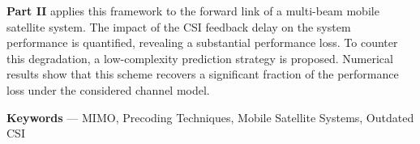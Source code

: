 \textbf{Part II} applies this framework to the forward link of a multi-beam mobile satellite system.
The impact of the \acs*{CSI} feedback delay on the system performance is quantified, revealing a substantial performance loss.
To counter this degradation, a low-complexity prediction strategy is proposed.
Numerical results show that this scheme recovers a significant fraction of the performance loss under the considered channel model.

\vspace{0.4cm}

\noindent\textbf{Keywords} --- 
\acs*{MIMO}, Precoding Techniques, Mobile Satellite Systems, Outdated \acs*{CSI}
